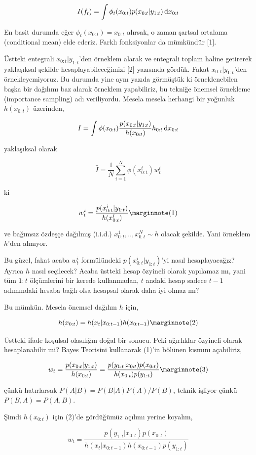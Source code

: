 \documentclass[12pt,fleqn]{article}\usepackage{../../common}
\begin{document}
$$ I(f_t) = \int \phi_t(x_{0:t}) p(x_{0:t} | y_{1:t}) \,\mathrm{d} x_{0:t} $$

En basit durumda eğer $\phi_t(x_{0:t}) =x_{0:t}$ alırsak, o zaman şartsal
ortalama (conditional mean) elde ederiz. Farklı fonksiyonlar da mümkündür [1].

Üstteki entegrali $x_{0:t} | y_{1:t}$'den örneklem alarak ve entegrali
toplam haline getirerek yaklaşıksal şekilde hesaplayabileceğimizi [2]
yazısında gördük. Fakat $x_{0:t} | y_{1:t}$'den örnekleyemiyoruz. Bu
durumda yine aynı yazıda görmüştük ki örneklenebilen başka bir dağılımı baz
alarak örneklem yapabiliriz, bu tekniğe önemsel örnekleme (importance
sampling) adı veriliyordu. Mesela mesela herhangi bir yoğunluk $h(x_{0:t})$
üzerinden,

$$ I = \int
\phi(x_{0:t})
\frac{ p(x_{0:t}|y_{1:t}) }{ h(x_{0:t}) } h_{0:t} \,\mathrm{d} x_{0:t}
$$

yaklaşıksal olarak

$$ \hat{I} = \frac{1}{N} \sum_{i=1}^{N} \phi (x^i_{0:t}) w^i_t  $$

ki

$$ 
w^i_t = \frac{p(x^i_{0:t}|y_{1:t})}{h(x^i_{0:t})} 
\mlabel{1} 
$$

ve bağımsız özdeşçe dağılmış (i.i.d.) $x^1_{0:t}, .., x^N_{0:t} \sim h$
olacak şekilde. Yani örneklem $h$'den alınıyor.

Bu güzel, fakat acaba $w^i_t$ formülündeki $p(x^i_{0:t}|y_{1:t})$'yi nasıl
hesaplayacağız? Ayrıca $h$ nasıl seçilecek? Acaba üstteki hesap özyineli olarak
yapılamaz mı, yani tüm $1:t$ ölçümlerini bir kerede kullanmadan, $t$ andaki
hesap sadece $t-1$ adımındaki hesaba bağlı olsa hesapsal olarak daha iyi olmaz
mı?

Bu mümkün. Mesela önemsel dağılım $h$ için,

$$ 
h(x_{0:t}) = h(x_t | x_{0:t-1}) h(x_{{0:t-1}}) 
\mlabel{2}
$$

Üstteki ifade koşulsal olasılığın doğal bir sonucu. Peki ağırlıklar özyineli
olarak hesaplanabilir mi? Bayes Teorisini kullanarak (1)'in bölünen kısmını
açabiliriz,

$$
w_t =
\frac{p(x_{0:t}|y_{1:t})}{h(x_{0:t})} =
\frac{p(y_{1:t}|x_{0:t}) p(x_{0:t})}{h(x_{0:t})p(y_{1:t}) }
\mlabel{3}
$$

çünkü hatırlarsak $P(A|B) = P(B|A)P(A) / P(B)$, teknik işliyor çünkü
$P(B,A)=P(A,B)$.  

Şimdi $h(x_{0:t})$ için (2)'de gördüğümüz açılımı yerine koyalım,

$$ w_t =
\frac{p(y_{1:t}|x_{0:t}) p(x_{0:t})}{h(x_t | x_{0:t-1}) h(x_{{0:t-1}}) p(y_{1:t}) }
$$
\end{document}
